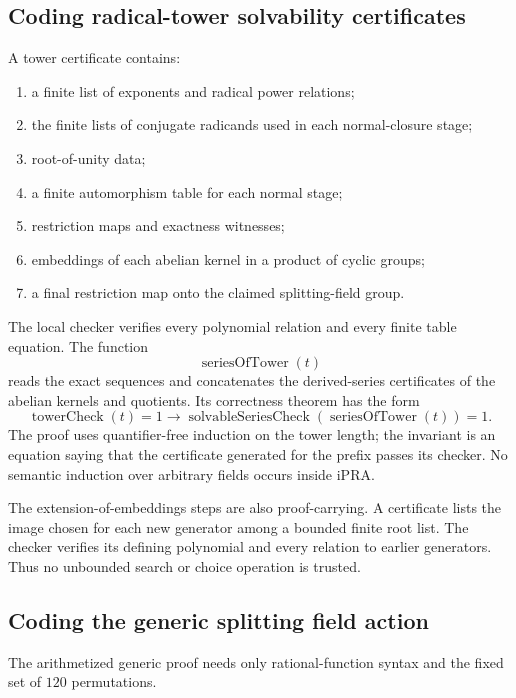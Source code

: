 \subsection{Coding radical-tower solvability certificates}

A tower certificate contains:

\begin{enumerate}
\item a finite list of exponents and radical power relations;
\item the finite lists of conjugate radicands used in each normal-closure
  stage;
\item root-of-unity data;
\item a finite automorphism table for each normal stage;
\item restriction maps and exactness witnesses;
\item embeddings of each abelian kernel in a product of cyclic groups;
\item a final restriction map onto the claimed splitting-field group.
\end{enumerate}

The local checker  verifies every polynomial relation and
every finite table equation.  The function
\[
 \operatorname{seriesOfTower}(t)
\]
reads the exact sequences and concatenates the derived-series certificates of
the abelian kernels and quotients.  Its correctness theorem has the form
\[
 \operatorname{towerCheck}(t)=1
 \to
 \operatorname{solvableSeriesCheck}
    (\operatorname{seriesOfTower}(t))=1.
 \tag{I4}\label{eq:tower-to-series}
\]
The proof uses quantifier-free induction on the tower length; the invariant is
an equation saying that the certificate generated for the prefix passes its
checker.  No semantic induction over arbitrary fields occurs inside iPRA.

The extension-of-embeddings steps are also proof-carrying.  A certificate lists
the image chosen for each new generator among a bounded finite root list.  The
checker verifies its defining polynomial and every relation to earlier
generators.  Thus no unbounded search or choice operation is trusted.

\subsection{Coding the generic splitting field action}

The arithmetized generic proof needs only rational-function syntax and the
fixed set of $120$ permutations.

